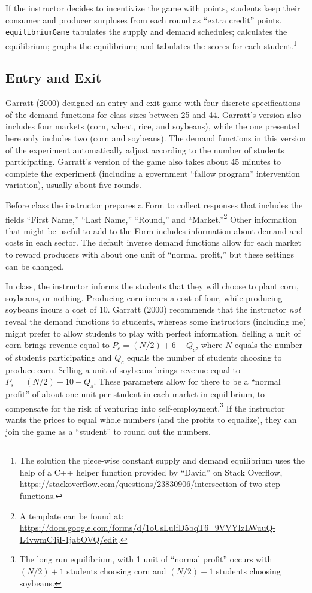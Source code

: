 \documentclass[
]{article}
\begin{document}
If the instructor decides to incentivize the game with points, students
keep their consumer and producer surpluses from each round as ``extra
credit'' points. \texttt{equilibriumGame} tabulates the supply and
demand schedules; calculates the equilibrium; graphs the equilibrium;
and tabulates the scores for each student.\footnote{The solution the
  piece-wise constant supply and demand equilibrium uses the help of a
  C++ helper function provided by ``David'' on Stack Overflow,
  \url{https://stackoverflow.com/questions/23830906/intersection-of-two-step-functions}.}

\hypertarget{entry-and-exit}{%
\subsection{Entry and Exit}\label{entry-and-exit}}

Garratt (2000) designed an entry and exit game with four discrete
specifications of the demand functions for class sizes between 25 and
44. Garratt's version also includes four markets (corn, wheat, rice, and
soybeans), while the one presented here only includes two (corn and
soybeans). The demand functions in this version of the experiment
automatically adjust according to the number of students participating.
Garratt's version of the game also takes about 45 minutes to complete
the experiment (including a government ``fallow program'' intervention
variation), usually about five rounds.

Before class the instructor prepares a Form to collect responses that
includes the fields ``First Name,'' ``Last Name,'' ``Round,'' and
``Market.''\footnote{A template can be found at:
  \url{https://docs.google.com/forms/d/1oUsLulfD5bqT6_9VVYIzLWuuQ-L4vwmC4jI-1jabOVQ/edit}.}
Other information that might be useful to add to the Form includes
information about demand and costs in each sector. The default inverse
demand functions allow for each market to reward producers with about
one unit of ``normal profit,'' but these settings can be changed.

In class, the instructor informs the students that they will choose to
plant corn, soybeans, or nothing. Producing corn incurs a cost of four,
while producing soybeans incurs a cost of 10. Garratt (2000) recommends
that the instructor \emph{not} reveal the demand functions to students,
whereas some instructors (including me) might prefer to allow students
to play with perfect information. Selling a unit of corn brings revenue
equal to \(P_c = (N/2) + 6 - Q_c\), where \(N\) equals the number of
students participating and \(Q_c\) equals the number of students
choosing to produce corn. Selling a unit of soybeans brings revenue
equal to \(P_s = (N/2) + 10 - Q_s\). These parameters allow for there to
be a ``normal profit'' of about one unit per student in each market in
equilibrium, to compensate for the risk of venturing into
self-employment.\footnote{The long run equilibrium, with 1 unit of
  ``normal profit'' occurs with \((N/2) + 1\) students choosing corn and
  \((N/2) - 1\) students choosing soybeans.} If the instructor wants the
prices to equal whole numbers (and the profits to equalize), they can
join the game as a ``student'' to round out the numbers.
\end{document}
